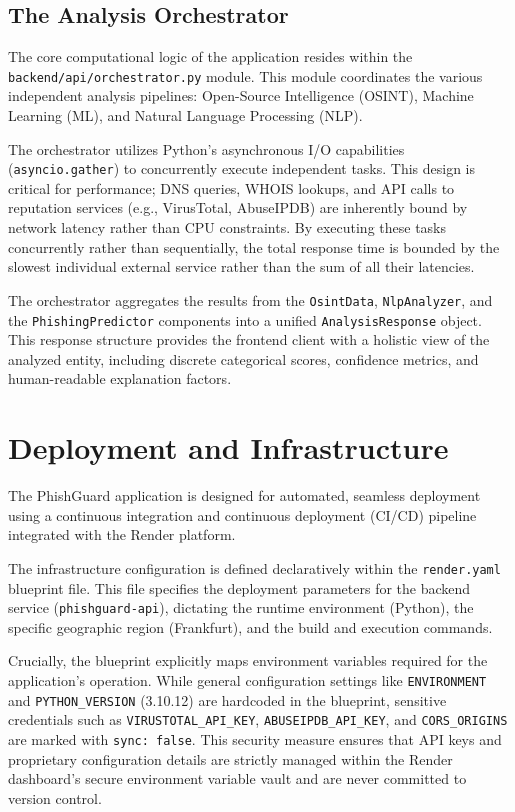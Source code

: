 \subsection{The Analysis Orchestrator}\label{the-analysis-orchestrator}

The core computational logic of the application resides within the
\texttt{backend/api/orchestrator.py} module. This module coordinates the
various independent analysis pipelines: Open-Source Intelligence
(OSINT), Machine Learning (ML), and Natural Language Processing (NLP).

The orchestrator utilizes Python's asynchronous I/O capabilities
(\texttt{asyncio.gather}) to concurrently execute independent tasks.
This design is critical for performance; DNS queries, WHOIS lookups, and
API calls to reputation services (e.g., VirusTotal, AbuseIPDB) are
inherently bound by network latency rather than CPU constraints. By
executing these tasks concurrently rather than sequentially, the total
response time is bounded by the slowest individual external service
rather than the sum of all their latencies.

The orchestrator aggregates the results from the \texttt{OsintData},
\texttt{NlpAnalyzer}, and the \texttt{PhishingPredictor} components into
a unified \texttt{AnalysisResponse} object. This response structure
provides the frontend client with a holistic view of the analyzed
entity, including discrete categorical scores, confidence metrics, and
human-readable explanation factors.


\section{Deployment and
Infrastructure}\label{deployment-and-infrastructure}

The PhishGuard application is designed for automated, seamless
deployment using a continuous integration and continuous deployment
(CI/CD) pipeline integrated with the Render platform.

The infrastructure configuration is defined declaratively within the
\texttt{render.yaml} blueprint file. This file specifies the deployment
parameters for the backend service (\texttt{phishguard-api}), dictating
the runtime environment (Python), the specific geographic region
(Frankfurt), and the build and execution commands.

Crucially, the blueprint explicitly maps environment variables required
for the application's operation. While general configuration settings
like \texttt{ENVIRONMENT} and \texttt{PYTHON\_VERSION} (3.10.12) are
hardcoded in the blueprint, sensitive credentials such as
\texttt{VIRUSTOTAL\_API\_KEY}, \texttt{ABUSEIPDB\_API\_KEY}, and
\texttt{CORS\_ORIGINS} are marked with \texttt{sync:\ false}. This
security measure ensures that API keys and proprietary configuration
details are strictly managed within the Render dashboard's secure
environment variable vault and are never committed to version control.

